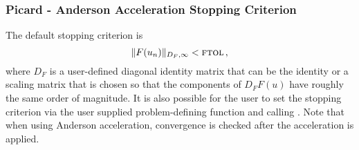 \subsubsection*{Picard - Anderson Acceleration Stopping Criterion}

The default stopping criterion is 
\[ \|F(u_n)\|_{D_F,\infty} < \mbox{\sc ftol} \, , \]
where $D_F$ is a user-defined diagonal identity matrix that can be the identity 
or a scaling matrix that is chosen so that the components of $D_F F(u)$ have 
roughly the same order of magnitude.
It is also possible for the user to set the stopping criterion via the user 
supplied problem-defining function and calling .  
Note that when using Anderson acceleration, 
convergence is checked after the acceleration is applied.




